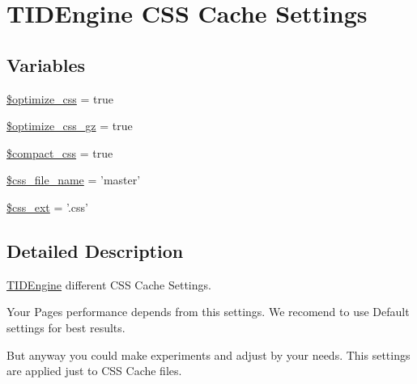 \hypertarget{group__css__cache__settings}{
\section{TIDEngine CSS Cache Settings}
\label{group__css__cache__settings}
}
\subsection*{Variables}
\begin{DoxyCompactItemize}
\item 
\hyperlink{group__css__cache__settings_ga3d807a2e23ba55310871e3ed6c2bd356}{\$optimize\_\-css} = true
\item 
\hyperlink{group__css__cache__settings_ga78989c70ad2b35d7026f6600cfe6ba92}{\$optimize\_\-css\_\-gz} = true
\item 
\hyperlink{group__css__cache__settings_gad7ca051062e3dc2de4fa237217abef86}{\$compact\_\-css} = true
\item 
\hyperlink{group__css__cache__settings_ga2864dee7a65933d1d4c94373d542b700}{\$css\_\-file\_\-name} = 'master'
\item 
\hyperlink{group__css__cache__settings_ga80329ee2b55f386978162762e84ac3ee}{\$css\_\-ext} = '.css'
\end{DoxyCompactItemize}


\subsection{Detailed Description}
\hyperlink{class_t_i_d_engine}{TIDEngine} different CSS Cache Settings.

Your Pages performance depends from this settings. We recomend to use Default settings for best results.\par
\par
 But anyway you could make experiments and adjust by your needs. This settings are applied just to CSS Cache files. 

